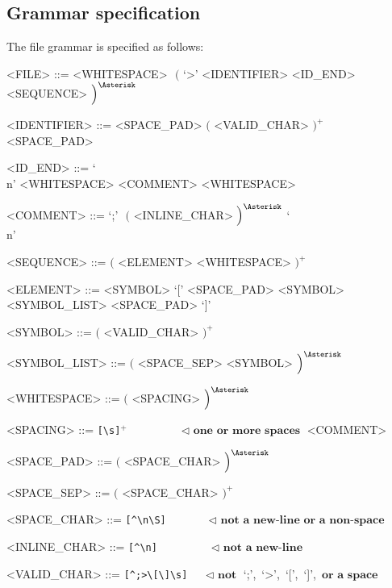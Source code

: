 \documentclass[12pt]{article}
\begin{document}
\subsection{Grammar specification}
The file grammar is specified as follows:

\setlength{\grammarparsep}{12pt plus 1pt minus 1pt} %
\setlength{\grammarindent}{10em} %

\begin{grammar}

  <FILE>         ::=  <WHITESPACE> $\,\,\Big($ `>' <IDENTIFIER> <ID_END> <SEQUENCE> $\Big)^{\Asterisk}$

  <IDENTIFIER>   ::=  <SPACE_PAD> $\Big($ <VALID_CHAR> $\Big)^{+}$ <SPACE_PAD>

  <ID_END>       ::=  `\\n' <WHITESPACE>
                 \alt <COMMENT> <WHITESPACE>

  <COMMENT>      ::=  `;' $\,\,\Big($ <INLINE_CHAR> $\Big)^{\Asterisk}$ `\\n'

  <SEQUENCE>     ::=  $\Big($ <ELEMENT> <WHITESPACE> $\Big)^{+}$
  
  <ELEMENT>      ::=  <SYMBOL>
                 \alt `[' <SPACE_PAD> <SYMBOL> <SYMBOL_LIST> <SPACE_PAD> `]'
 
  <SYMBOL>       ::=  $\Big($ <VALID_CHAR> $\Big)^{+}$
                 
  <SYMBOL_LIST>  ::=  $\Big($ <SPACE_SEP> <SYMBOL> $\Big)^{\Asterisk}$
  
  <WHITESPACE>   ::=  $\Big($ <SPACING> $\Big)^{\Asterisk}$

  <SPACING>      ::=  \verb![\s]!$^{+}$  $\quad\,\quad\quad\quad \lhd \,\, \textbf{one or more spaces}$
                 \alt <COMMENT>

  <SPACE_PAD>    ::=  $\Big($ <SPACE_CHAR> $\Big)^{\Asterisk}$

  <SPACE_SEP>    ::=  $\Big($ <SPACE_CHAR> $\Big)^{+}$

  <SPACE_CHAR>   ::=  \verb![^\n\S]!     $\quad\,\quad\quad      \lhd \,\, \textbf{not a new-line or a non-space}$

  <INLINE_CHAR>  ::=  \verb![^\n]!       $\quad\,\quad\quad\quad \lhd \,\, \textbf{not a new-line}$

  <VALID_CHAR>   ::=  \verb![^;>\[\]\s]! $\quad                  \lhd \,\, \textbf{not}$ `;',$\,$ `>',$\,$ `[',$\,$ `]', $\,\textbf{or a space}$


  
\end{grammar}
\end{document}
